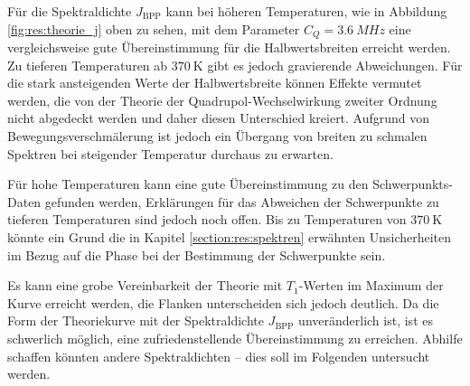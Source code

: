 Für die Spektraldichte $J_\text{BPP}$ kann bei höheren Temperaturen, wie in Abbildung \ref{fig:res:theorie_j} oben zu sehen, mit dem Parameter $C_Q = \SI{3.6}{MHz}$ eine vergleichsweise gute Übereinstimmung für die Halbwertsbreiten erreicht werden. Zu tieferen Temperaturen ab $\SI{370}{\kelvin}$ gibt es jedoch gravierende Abweichungen. Für die stark ansteigenden Werte der Halbwertsbreite können Effekte vermutet werden, die von der Theorie der Quadrupol-Wechselwirkung zweiter Ordnung nicht abgedeckt werden und daher diesen Unterschied kreiert. Aufgrund von Bewegungsverschmälerung ist jedoch ein Übergang von breiten zu schmalen Spektren bei steigender Temperatur durchaus zu erwarten.

Für hohe Temperaturen kann eine gute Übereinstimmung zu den Schwerpunkts-Daten gefunden werden, Erklärungen für das Abweichen der Schwerpunkte zu tieferen Temperaturen sind jedoch noch offen. Bis zu Temperaturen von $\SI{370}{\kelvin}$ könnte ein Grund die in Kapitel \ref{section:res:spektren} erwähnten Unsicherheiten im Bezug auf die Phase bei der Bestimmung der Schwerpunkte sein.

Es kann eine grobe Vereinbarkeit der Theorie mit $T_1$-Werten im Maximum der Kurve erreicht werden, die Flanken unterscheiden sich jedoch deutlich. Da die Form der Theoriekurve mit der Spektraldichte $J_\text{BPP}$ unveränderlich ist, ist es schwerlich möglich, eine zufriedenstellende Übereinstimmung zu erreichen. Abhilfe schaffen könnten andere Spektraldichten -- dies soll im Folgenden untersucht werden.


